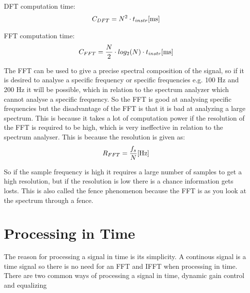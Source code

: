 DFT computation time:
\begin{equation}
C_{DFT} = N^{2}\cdot t_{instr} \enhed{ms}
\end{equation}
\begin{where}
\end{where}

FFT computation time:
\begin{equation}
C_{FFT} = \frac{N}{2}\cdot log_{2}(N)\cdot t_{instr} \enhed{ms}
\end{equation}
\begin{where}
\end{where}

The FFT can be used to give a precise spectral composition of the signal, so if it is desired to analyse a specific frequency or specific frequencies e.g. 100 Hz and 200 Hz it will be possible, which in relation to the spectrum analyzer which cannot analyse a specific frequency. So the FFT is good at analysing specific frequencies but the disadvantage of the FFT is that it is bad at analyzing a large spectrum. This is because it takes a lot of computation power if the resolution of the FFT is required to be high, which is very ineffective in relation to the spectrum analyser. This is because the resolution is given as:
\begin{equation}
R_{FFT} = \frac{f_s}{N} \enhed{Hz}
\end{equation}
\begin{where}
\end{where} 

So if the sample frequency is high it requires a large number of samples to get a high resolution, but if the resolution is low there is a chance information gets losts. This is also called the fence phenomenon because the FFT is as you look at the spectrum through a fence. 









\section{Processing in Time}
The reason for processing a signal in time is its simplicity. A continous signal is a time signal so there is no need for an FFT and IFFT when processing in time. There are two common ways of processing a signal in time, dynamic gain control and equalizing  


